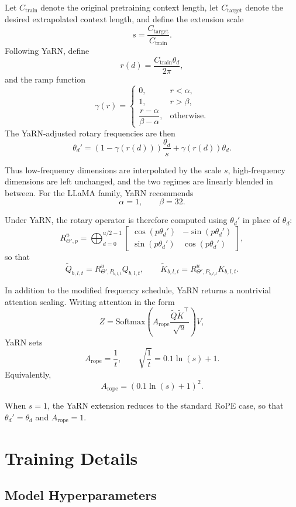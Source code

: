 \documentclass[11pt]{article}
\begin{document}
Let $C_{\mathrm{train}}$ denote the original pretraining context length, let $C_{\mathrm{target}}$ denote the desired extrapolated context length, and define the extension scale
\[
s=\frac{C_{\mathrm{target}}}{C_{\mathrm{train}}}.
\]
Following YaRN, define
\[
r(d)=\frac{C_{\mathrm{train}}\theta_d}{2\pi},
\]
and the ramp function
\[
\gamma(r)=
\begin{cases}
0, & r<\alpha,\\[4pt]
1, & r>\beta,\\[4pt]
\dfrac{r-\alpha}{\beta-\alpha}, & \text{otherwise}.
\end{cases}
\]
The YaRN-adjusted rotary frequencies are then
\[
\theta_d'
=
\left(1-\gamma(r(d))\right)\frac{\theta_d}{s}
+
\gamma(r(d))\theta_d.
\]

Thus low-frequency dimensions are interpolated by the scale $s$, high-frequency dimensions are left unchanged, and the two regimes are linearly blended in between. For the LLaMA family, YaRN recommends
\[
\alpha = 1,
\qquad
\beta = 32.
\]

Under YaRN, the rotary operator is therefore computed using $\theta_d'$ in place of $\theta_d$:
\[
R_{\Theta',p}^{u}
=
\bigoplus_{d=0}^{u/2-1}
\begin{bmatrix}
\cos(p\theta_d') & -\sin(p\theta_d') \\
\sin(p\theta_d') & \cos(p\theta_d')
\end{bmatrix},
\]
so that
\[
\tilde{Q}_{b,l,t} = R_{\Theta',P_{b,l,t}}^{u} Q_{b,l,t},
\qquad
\tilde{K}_{b,l,t} = R_{\Theta',P_{b,l,t}}^{u} K_{b,l,t}.
\]

In addition to the modified frequency schedule, YaRN returns a nontrivial attention scaling. Writing attention in the form
\[
Z = \mathrm{Softmax}\!\left(
A_{\mathrm{rope}}\frac{\tilde{Q}\tilde{K}^{\top}}{\sqrt{u}}
\right)V,
\]
YaRN sets
\[
A_{\mathrm{rope}}=\frac{1}{t},
\qquad
\sqrt{\frac{1}{t}} = 0.1\ln(s)+1.
\]
Equivalently,
\[
A_{\mathrm{rope}}=\left(0.1\ln(s)+1\right)^2.
\]

When $s=1$, the YaRN extension reduces to the standard RoPE case, so that $\theta_d'=\theta_d$ and $A_{\mathrm{rope}}=1$.

\section{Training Details}
\label{app:reproduction}

\subsection{Model Hyperparameters}
\label{app:hyperparameters}
\end{document}
